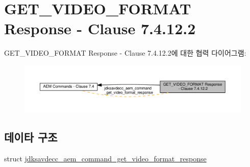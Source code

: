\hypertarget{group__command__get__video__format__response}{}\section{G\+E\+T\+\_\+\+V\+I\+D\+E\+O\+\_\+\+F\+O\+R\+M\+AT Response -\/ Clause 7.4.12.2}
\label{group__command__get__video__format__response}
G\+E\+T\+\_\+\+V\+I\+D\+E\+O\+\_\+\+F\+O\+R\+M\+AT Response -\/ Clause 7.4.12.2에 대한 협력 다이어그램\+:
\nopagebreak
\begin{figure}[H]
\begin{center}
\leavevmode
\includegraphics[width=350pt]{group__command__get__video__format__response}
\end{center}
\end{figure}
\subsection*{데이타 구조}
\begin{DoxyCompactItemize}
\item 
struct \hyperlink{structjdksavdecc__aem__command__get__video__format__response}{jdksavdecc\+\_\+aem\+\_\+command\+\_\+get\+\_\+video\+\_\+format\+\_\+response}
\end{DoxyCompactItemize}
